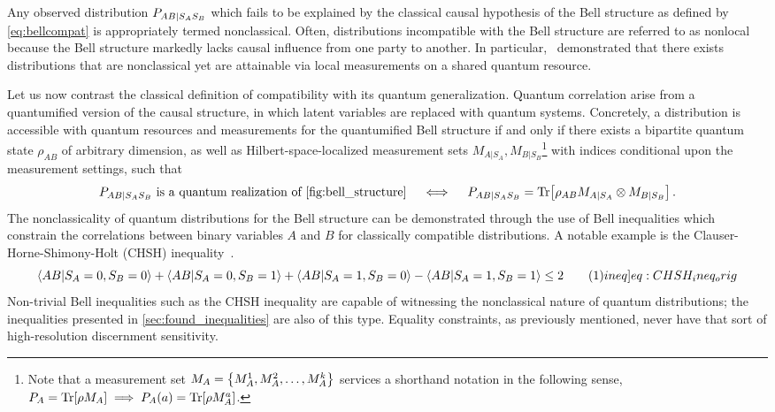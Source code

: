 \documentclass[aps, 10pt, english, twoside, pra, nofootinbib, tightenlines, longbibliography, superscriptaddress]{revtex4-1}
\begin{document}
    Any observed distribution $\prob[AB|S_AS_B]$ which fails to be explained by the classical causal hypothesis of the Bell structure as defined by \cref{eq:bellcompat} is appropriately termed nonclassical. Often, distributions incompatible with the Bell structure are referred to as nonlocal because the Bell structure markedly lacks causal influence from one party to another. In particular,~\citet{Bell_1964} demonstrated that there exists distributions that are nonclassical yet are attainable via local measurements on a shared quantum resource.

    Let us now contrast the classical definition of compatibility with its quantum generalization. Quantum correlation arise from a quantumified version of the causal structure, in which latent variables are replaced with quantum systems. Concretely, a distribution is accessible with quantum resources and measurements for the quantumified Bell structure if and only if there exists a bipartite quantum state $\rho_{AB}$ of arbitrary dimension, as well as Hilbert-space-localized measurement sets $M_{A|S_A}, M_{B|S_B}$\footnote{Note that a measurement set $M_{A} = \bc{M_{A}^{1}, M_{A}^{2}, \ldots, M_{A}^{k}}$ services a shorthand notation in the following sense, $\prob[A] = \Tr\bs{\rho M_{A}} \implies \prob[A]\br{a} = \Tr\bs{\rho M_{A}^{a}}$.} with indices conditional upon the measurement settings, such that
    \begin{align}\label{eq:bellQcompat}
    \prob[AB|S_AS_B] \text{ is a quantum realization of \cref{fig:bell_structure}} \quad\iff\quad\prob[AB|S_AS_B] = \Tr\bs{\rho_{AB}M_{A|S_A}\otimes M_{B|S_B}}\,.
    \end{align}
    The nonclassicality of quantum distributions for the Bell structure can be demonstrated through the use of Bell inequalities which constrain the correlations between binary variables $A$ and $B$ for classically compatible distributions. A notable example is the Clauser-Horne-Shimony-Holt (CHSH) inequality~\cite{CHSH_Original}.
    \[ \ba{AB | S_{A} = 0, S_{B} = 0} + \ba{AB | S_{A} = 0, S_{B} = 1} + \ba{AB | S_{A} = 1, S_{B} = 0} - \ba{AB | S_{A} = 1, S_{B} = 1} \leq 2 \eq \label[ineq]{eq:CHSH_ineq_orig} \]
    Non-trivial Bell inequalities such as the CHSH inequality are capable of witnessing the nonclassical nature of quantum distributions; the inequalities presented in \cref{sec:found_inequalities} are also of this type. Equality constraints, as previously mentioned, never have that sort of high-resolution discernment sensitivity.
\end{document}
